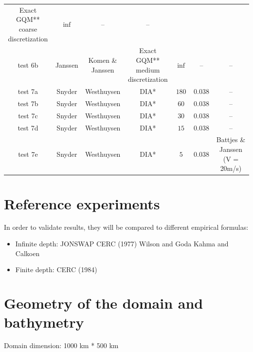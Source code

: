 \begin{table}[H]
\begin{center}
\begin{tabular*}{\linewidth}{@{\extracolsep{\fill}}ccccccc}
\minitab[c]{Exact GQM** \\ coarse \\ discretization} &
$\inf$ & -- & -- \\
test 6b  & Janssen \citep{Janssen1989,Janssen1991} &
\minitab[c]{Komen \citep{Komen1984} \& \\ Janssen \citep{Janssen1991}} &
\minitab[c]{Exact GQM** \\ medium \\ discretization} &
$\inf$ & -- & -- \\
\midrule
test 7a  & Snyder \citep{Snyder1981} &
Westhuysen \citep{Westhuys2007} &
DIA* & $180$ & $0.038$ & -- \\
test 7b  & Snyder \citep{Snyder1981} &
Westhuysen \citep{Westhuys2007} &
DIA* & $60$ & $0.038$ & -- \\
test 7c  & Snyder \citep{Snyder1981} &
Westhuysen \citep{Westhuys2007} &
DIA* & $30$ & $0.038$ & -- \\
test 7d  & Snyder \citep{Snyder1981} &
Westhuysen \citep{Westhuys2007} &
DIA* & $15$ & $0.038$ & -- \\
test 7e  & Snyder \citep{Snyder1981} &
Westhuysen \citep{Westhuys2007} &
DIA* & $5$ & $0.038$ & 
\minitab[c]{Battjes \& \\ Janssen \\ (V = 20m/s)} \\
\bottomrule
\bottomrule
\end{tabular*}
%
\end{center}
\end{table}

\section{Reference experiments}
In order to validate \tomawac results, they will be compared to different
empirical formulas:
\begin{itemize}
\item Infinite depth:
\subitem JONSWAP \cite{Hasselmann1973}
\subitem CERC (1977) \cite{CERC77}
\subitem Wilson and Goda \cite{Wilson1965}
\subitem Kahma and Calkoen \cite{Kahma1992}
\item Finite depth:
\subitem CERC (1984)\cite{CERC84}
\end{itemize}

\section{Geometry of the domain and bathymetry}
Domain  dimension: 1000 km * 500 km

